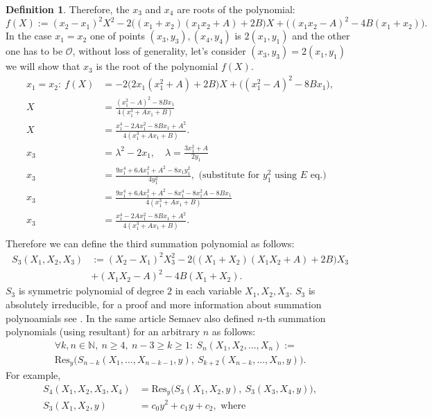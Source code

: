 \documentclass[thesis=M,english]{FITthesis}[2012/10/20]
\theoremstyle{remark}
\theoremstyle{definition}
\newtheorem{DF}{Definition}[section]
\begin{document}
\begin{DF}
Therefore, the $x_3$ and $x_4$ are roots of the polynomial:
$$
f(X) := (x_2-x_1)^2X^2-2\bigg((x_1+x_2)(x_1x_2 + A) + 2B\bigg)X + \bigg((x_1x_2-A)^2 - 4B(x_1+x_2)\bigg).
$$
In the case $x_1=x_2$ one of points $(x_3,y_3), (x_4,y_4)$ is $2(x_1,y_1)$ and the other one has to be $\mathcal{O}$, without loss of generality, let's consider $(x_3,y_3) = 2(x_1,y_1)$ we will show that $x_3$ is the root of the polynomial $f(X)$.
\begin{align*}
x_1 = x_2:\ f(X) &= -2\bigg(2x_1(x_1^2+A)+2B\bigg)X +\bigg((x_1^2-A)^2-8Bx_1\bigg),
\\ X &= \frac{(x_1^2-A)^2-8Bx_1}{4(x_1^3+Ax_1+B)} \\ 
	X &= \frac{x_1^4-2Ax_1^2-8Bx_1+A^2}{4(x_1^3+Ax_1+B)}. \\
	x_3 &= \lambda^2 -2x_1, \quad \lambda = \frac{3x_1^2+A}{2y_1} \\
	x_3 &= \frac{9 x_{1}^{4} + 6 Ax_{1}^{2} + A^{2} -8x_1y_1^2}{4y_1^2}, \text{ (substitute for $y_1^2$ using $E$ eq.)} \\
	x_3 &= \frac{9 x_{1}^{4} + 6A x_{1}^{2} + A^{2}-8 x_{1}^{4} - 8 x_{1}^{2} A - 8B x_{1}}{4(x_1^3+Ax_1+B)} \\
	x_3 &= \frac{x_1^4-2Ax_1^2 - 8Bx_1+ A^2}{4(x_1^3+Ax_1+B)}. \\
\end{align*}
Therefore we can define the third summation polynomial as follows:
\begin{align*}
S_3(X_1,X_2,X_3) &:= (X_2-X_1)^2X_3^2-2\bigg((X_1+X_2)(X_1X_2 + A) + 2B\bigg)X_3\\
&+ (X_1X_2-A)^2 - 4B(X_1+X_2).
\end{align*}
$S_3$ is symmetric polynomial of degree $2$ in each variable $X_1,X_2,X_3$. $S_3$ is absolutely irreducible, for a proof and more information about summation polynoamials see \cite{semaev04}. In the same article Semaev also defined $n$-th summation polynomials (using resultant) for an arbitrary $n$ as follows:
\begin{align*}
\forall k,n \in \mathbb{N},\ n \geq 4,\ n-3\geq k \geq 1:\ S_n(X_1,X_2,\ldots, X_n) := \\ \text{Res}_y\bigg(S_{n-k}(X_1,\ldots,X_{n-k-1},y),\ S_{k+2}(X_{n-k},\ldots,X_n,y)\bigg).
\end{align*}
For example, 
\begin{align*}
S_4(X_1,X_2,X_3,X_4) &= \text{Res}_y\bigg(S_3(X_1,X_2,y),\ S_3(X_3,X_4,y)\bigg), \\
S_3(X_1,X_2,y) &= c_0y^2 + c_1y + c_2, \text{ where } \\

\end{align*}
\end{DF}
\end{document}
